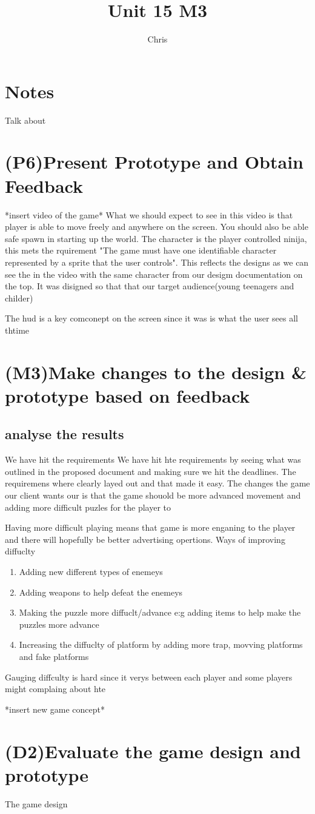 \documentclass{article}
\begin{document}
\title{Unit 15 M3}
\author{Chris}
\date{}
\maketitle

\section{Notes}
Talk about 


\section{(P6)Present Prototype and Obtain Feedback}
*insert video of the game*
What we should expect to see in this video is that player is able to move freely and anywhere on the screen. You should also be able safe spawn in starting up the world.
The character is the player controlled ninija, this mets the rquirement "The game must have one identifiable character represented by a sprite that the user controls". This reflects the designs as we can see the in the video with the same character from our desigm documentation on the top. It was disigned so that that our target audience(young teenagers and childer)

The hud is a key comconept on the screen since it was is what the user sees all thtime


\section{(M3)Make changes to the design \& prototype based on feedback}

\subsection{analyse the results}
We have hit the requirements 
We have hit hte requirements by seeing what was outlined in the proposed document and making sure we hit the deadlines. The requiremens where clearly layed out and that made it easy.
The changes the game our client wants our is that the game shouold be more advanced movement and adding more difficult puzles for the player to 

Having more difficult playing means that game is more enganing to the player and there will hopefully be better advertising opertions. 
Ways of improving diffuclty
\begin{enumerate}
	\item Adding new different types of enemeys
	\item Adding weapons to help defeat the enemeys
	\item Making the puzzle more diffuclt/advance e:g adding items to help make the puzzles more advance 
	\item Increasing the diffuclty of platform by adding more trap, movving platforms and fake platforms
\end{enumerate}

Gauging diffculty is hard since it verys between each player and some players might complaing about hte 

*insert new game concept*

\section{(D2)Evaluate the game design and prototype}
The game design 
\end{document}
